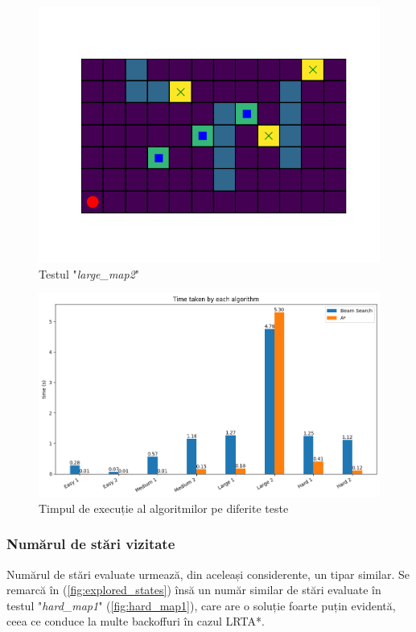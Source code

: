 \documentclass{article}
\begin{document}
\begin{figure}[ht]
    \begin{center}
        \includegraphics[scale=0.4]{large_map2.png}
    \end{center}
    \caption{Testul "\textit{large\_map2}"}
    \label{fig:large_map_2}
\end{figure}

\begin{figure}[ht]
    \includegraphics[scale=0.55]{solution/time.png}
    \caption{Timpul de execuție al algoritmilor pe diferite teste}
    \label{fig:time}
\end{figure}

\subsubsection*{Numărul de stări vizitate}
Numărul de stări evaluate urmează, din aceleași considerente, un tipar similar.
Se remarcă în (\ref{fig:explored_states}) însă un număr similar de stări 
evaluate în testul "\textit{hard\_map1}" (\ref{fig:hard_map1}), care are o 
soluție foarte puțin evidentă, ceea ce conduce la multe backoffuri în cazul 
LRTA*.
\end{document}
